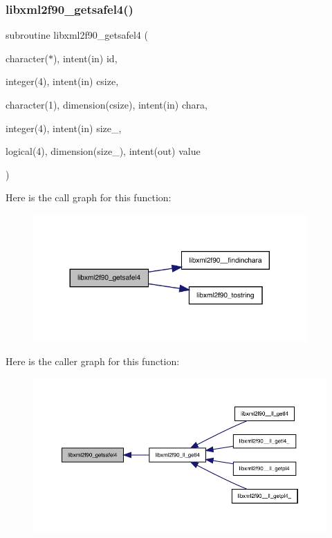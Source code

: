 \subsubsection{\texorpdfstring{libxml2f90\+\_\+getsafel4()}{libxml2f90\_getsafel4()}}
{\footnotesize\ttfamily subroutine libxml2f90\+\_\+getsafel4 (\begin{DoxyParamCaption}\item[{character($\ast$), intent(in)}]{id,  }\item[{integer(4), intent(in)}]{csize,  }\item[{character(1), dimension(csize), intent(in)}]{chara,  }\item[{integer(4), intent(in)}]{size\+\_\+,  }\item[{logical(4), dimension(size\+\_\+), intent(out)}]{value }\end{DoxyParamCaption})}

Here is the call graph for this function\+:
\nopagebreak
\begin{figure}[H]
\begin{center}
\leavevmode
\includegraphics[width=296pt]{libxml2f90_8f90__pp_8f90_a28f8b34bc930ad861c2ee4d764f945ba_cgraph}
\end{center}
\end{figure}
Here is the caller graph for this function\+:
\nopagebreak
\begin{figure}[H]
\begin{center}
\leavevmode
\includegraphics[width=350pt]{libxml2f90_8f90__pp_8f90_a28f8b34bc930ad861c2ee4d764f945ba_icgraph}
\end{center}
\end{figure}
\mbox{\label{libxml2f90_8f90__pp_8f90_a7851da50fe7a6768aa6f0d04aa9345a0}} 
